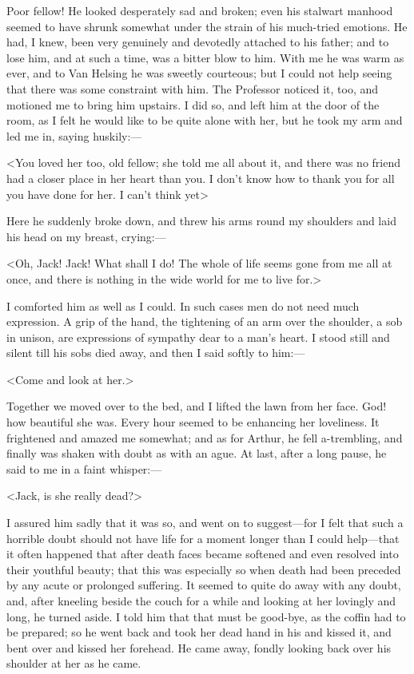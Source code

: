 Poor fellow! He looked desperately sad and broken; even his stalwart manhood seemed to have shrunk somewhat under the strain of his much-tried emotions. He had, I knew, been very genuinely and devotedly attached to his father; and to lose him, and at such a time, was a bitter blow to him. With me he was warm as ever, and to Van Helsing he was sweetly courteous; but I could not help seeing that there was some constraint with him. The Professor noticed it, too, and motioned me to bring him upstairs. I did so, and left him at the door of the room, as I felt he would like to be quite alone with her, but he took my arm and led me in, saying huskily:—

<You loved her too, old fellow; she told me all about it, and there was no friend had a closer place in her heart than you. I don't know how to thank you for all you have done for her. I can't think yet>

Here he suddenly broke down, and threw his arms round my shoulders and laid his head on my breast, crying:—

<Oh, Jack! Jack! What shall I do! The whole of life seems gone from me all at once, and there is nothing in the wide world for me to live for.>

I comforted him as well as I could. In such cases men do not need much expression. A grip of the hand, the tightening of an arm over the shoulder, a sob in unison, are expressions of sympathy dear to a man's heart. I stood still and silent till his sobs died away, and then I said softly to him:—

<Come and look at her.>

Together we moved over to the bed, and I lifted the lawn from her face. God! how beautiful she was. Every hour seemed to be enhancing her loveliness. It frightened and amazed me somewhat; and as for Arthur, he fell a-trembling, and finally was shaken with doubt as with an ague. At last, after a long pause, he said to me in a faint whisper:—

<Jack, is she really dead?>

I assured him sadly that it was so, and went on to suggest—for I felt that such a horrible doubt should not have life for a moment longer than I could help—that it often happened that after death faces became softened and even resolved into their youthful beauty; that this was especially so when death had been preceded by any acute or prolonged suffering. It seemed to quite do away with any doubt, and, after kneeling beside the couch for a while and looking at her lovingly and long, he turned aside. I told him that that must be good-bye, as the coffin had to be prepared; so he went back and took her dead hand in his and kissed it, and bent over and kissed her forehead. He came away, fondly looking back over his shoulder at her as he came.

